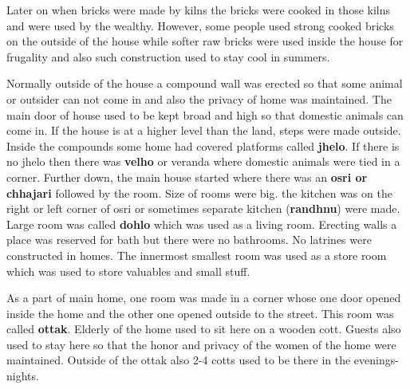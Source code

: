 Later on when bricks were made by kilns the bricks were cooked in those kilns
and were used by the wealthy. However, some people used strong cooked bricks on
the outside of the house while softer raw bricks were used inside the house for
frugality and also such construction used to stay cool in summers.

Normally outside of the house a compound wall was erected so that some animal or
outsider can not come in and also the privacy of home was maintained. The main
door of house used to be kept broad and high so that domestic animals can come
in. If the house is at a higher level than the land, steps were made outside.
Inside the compounds some home had covered platforms called \textbf{jhelo}. If
there is no jhelo then there was \textbf{velho} or veranda where domestic
animals were tied in a corner. Further down, the main house started where there
was an \textbf{osri or chhajari} followed by the room. Size of rooms were big.
the kitchen was on the right or left corner of osri or sometimes separate
kitchen (\textbf{randhnu}) were made. Large room was called \textbf{dohlo} which
was used as a living room. Erecting walls a place was reserved for bath but
there were no bathrooms. No latrines were constructed in homes. The innermost
smallest room was used as a store room which was used to store valuables and
small stuff. 

As a part of main home, one room was made in a corner whose one door opened
inside the home and the other one opened outside to the street. This room was
called \textbf{ottak}. Elderly of the home used to sit here on a wooden cott.
Guests also used to stay here so that the honor and privacy of the women of the
home were maintained. Outside of the ottak also 2-4 cotts used to be there in
the evenings-nights.

